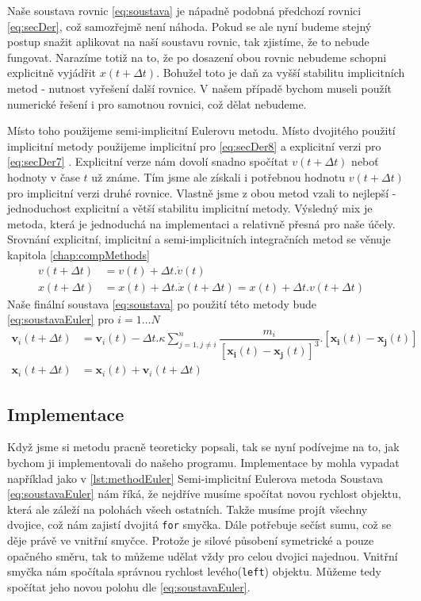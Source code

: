Naše soustava rovnic \eqref{eq:soustava} je nápadně podobná předchozí rovnici \eqref{eq:secDer}, což samozřejmě není náhoda. Pokud se ale nyní budeme stejný postup snažit aplikovat na naší soustavu rovnic, tak zjistíme, že to nebude fungovat. Narazíme totiž na to, že po dosazení obou rovnic nebudeme schopni explicitně vyjádřit $ x(t + \Delta t) $. Bohužel toto je daň za vyšší stabilitu implicitních metod - nutnost vyřešení další rovnice. V našem případě bychom museli použít numerické řešení i pro samotnou rovnici, což dělat nebudeme.

Místo toho použijeme semi-implicitní Eulerovu metodu. Místo dvojitého použití implicitní metody použijeme implicitní pro \eqref{eq:secDer8} a explicitní verzi pro \eqref{eq:secDer7} . Explicitní verze nám dovolí snadno spočítat $ v(t + \Delta t) $ neboť hodnoty v čase $ t $ už známe. Tím jsme ale získali i potřebnou hodnotu $ v(t + \Delta t) $ pro implicitní verzi druhé rovnice. Vlastně jsme z obou metod vzali to nejlepší - jednoduchost explicitní a větší stabilitu implicitní metody. Výsledný mix je metoda, která je jednoduchá na implementaci a relativně přesná pro naše účely. Srovnání explicitní, implicitní a semi-implicitních integračních metod se věnuje kapitola \ref{chap:compMethods}
\begin{align}
\label{eq:secDer7}
v(t + \Delta t)&=v(t) + \Delta t . \dot{v}(t)\\
\label{eq:secDer8}
x(t+\Delta t) &= x(t) + \Delta t. \dot{x}(t + \Delta t) = x(t) + \Delta t.v(t + \Delta t)\quad
\end{align}
Naše finální soustava \eqref{eq:soustava} po použití této metody bude \eqref{eq:soustavaEuler} pro $ i=1 \dots N $
\begin{subequations}\label{eq:soustavaEuler}
\begin{align}
\boldsymbol {v}_i(t+\Delta t) &=\boldsymbol{{v}}_i(t)  - \Delta t . \kappa \sum_{j=1,j \neq i}^{n}\dfrac{m_i}
{\left[ \boldsymbol{x_i}(t) - \boldsymbol{x_j}(t)\right] ^3} . 
\left[ \boldsymbol{x_i}(t) - \boldsymbol{x_j}(t)\right] \\
\boldsymbol {x}_i(t+\Delta t)& =\boldsymbol{{x}}_i(t)  +\boldsymbol {v}_i(t+\Delta t)
\end{align}
\end{subequations}
\subsection{Implementace}
Když jsme si metodu pracně teoreticky popsali, tak se nyní podívejme na to, jak bychom ji implementovali do našeho programu. Implementace by mohla vypadat například jako v \ref{lst:methodEuler}
{Semi-implicitní Eulerova metoda}
Soustava \eqref{eq:soustavaEuler} nám říká, že nejdříve musíme spočítat novou rychlost objektu, která ale záleží na polohách všech ostatních. Takže musíme projít všechny dvojice, což nám zajistí dvojitá \texttt{for} smyčka. Dále potřebuje sečíst sumu, což se děje právě ve vnitřní smyčce. Protože je silové působení symetrické a pouze opačného směru, tak to můžeme udělat vždy pro celou dvojici najednou.
Vnitřní smyčka nám spočítala správnou rychlost levého(\texttt{left}) objektu.
Můžeme tedy spočítat jeho novou polohu dle \eqref{eq:soustavaEuler}.

